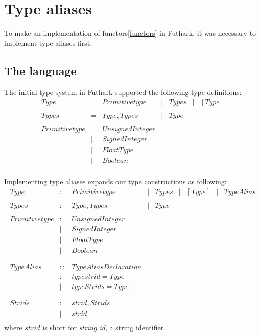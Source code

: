 \section{Type aliases}
To make an implementation of functors\ref{functors} in Futhark, it was necessary
to implement type aliases first.



\subsection{The language}
The initial type system in Futhark supported the following type definitions:
\begin{align*}
  Type           & = & Primitive type
                 & | & { Types }
                 & | & [ Type ]
  \\
  \\
  Types          & = & Type , Types
                 & | & Type
  \\
  \\
  Primitive type & = & UnsignedInteger \\
                 & | & SignedInteger \\
                 & | & FloatType \\
                 & | & Boolean \\
\end{align*}

Implementing type aliases expands our type constructions as following:
\begin{align*}
  Type           & : & Primitive type
                 & | & { Types }
                 & | & [ Type ]
                 & | & TypeAlias
  \\
  \\
  Types          & : & Type , Types
                 & | & Type
  \\
  \\
  Primitive type & : & UnsignedInteger \\
                 & | & SignedInteger \\
                 & | & FloatType \\
                 & | & Boolean \\
  \\
  \\
  TypeAlias      & :: & { TypeAliasDeclaration } \\
                 & :  & type strid = Type \\
                 & |  & type Strids = Type \\
  \\
  \\
  Strids         & :  & strid , Strids \\
                 & |  & strid \\
\end{align*}
where $strid$ is short for \textit{string id}, a string identifier.

